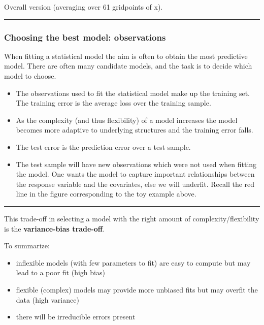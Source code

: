 \documentclass[]{article}
\providecommand{\tightlist}{%
  \setlength{\itemsep}{0pt}\setlength{\parskip}{0pt}}
\begin{document}
Overall version (averaging over 61 gridpoints of x).

\begin{center}\rule{0.5\linewidth}{\linethickness}\end{center}

\hypertarget{choosing-the-best-model-observations}{%
\subsubsection{Choosing the best model:
observations}\label{choosing-the-best-model-observations}}

When fitting a statistical model the aim is often to obtain the most
predictive model. There are often many candidate models, and the task is
to decide which model to choose.

\begin{itemize}
\tightlist
\item
  The observations used to fit the statistical model make up the
  training set. The training error is the average loss over the training
  sample.
\item
  As the complexity (and thus flexibility) of a model increases the
  model becomes more adaptive to underlying structures and the training
  error falls.
\item
  The test error is the prediction error over a test sample.
\item
  The test sample will have new observations which were not used when
  fitting the model. One wants the model to capture important
  relationships between the response variable and the covariates, else
  we will underfit. Recall the red line in the figure corresponding to
  the toy example above.
\end{itemize}

\begin{center}\rule{0.5\linewidth}{\linethickness}\end{center}

This trade-off in selecting a model with the right amount of
complexity/flexibility is the \textbf{variance-bias trade-off}.

To summarize:

\begin{itemize}
\tightlist
\item
  inflexible models (with few parameters to fit) are easy to compute but
  may lead to a poor fit (high bias)
\item
  flexible (complex) models may provide more unbiased fits but may
  overfit the data (high variance)
\item
  there will be irreducible errors present
\end{itemize}
\end{document}

